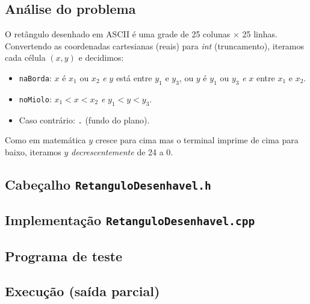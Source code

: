 \documentclass[11pt,a4paper]{article}
\begin{document}
\subsection*{An\'alise do problema}

O ret\^angulo desenhado em ASCII \'e uma grade de 25 colunas $\times$ 25 linhas. Convertendo as coordenadas cartesianas (reais) para \emph{int} (truncamento), iteramos cada c\'elula $(x, y)$ e decidimos:

\begin{itemize}[leftmargin=*,itemsep=0pt]
  \item \texttt{naBorda}: $x$ \'e $x_1$ ou $x_2$ \emph{e} $y$ est\'a entre $y_1$ e $y_3$, ou $y$ \'e $y_1$ ou $y_3$ \emph{e} $x$ entre $x_1$ e $x_2$.
  \item \texttt{noMiolo}: $x_1 < x < x_2$ \emph{e} $y_1 < y < y_3$.
  \item Caso contr\'ario: \texttt{.} (fundo do plano).
\end{itemize}

Como em matem\'atica $y$ cresce para cima mas o terminal imprime de cima para baixo, iteramos $y$ \emph{decrescentemente} de 24 a 0.

\subsection*{Cabe\c{c}alho \texttt{RetanguloDesenhavel.h}}



\subsection*{Implementa\c{c}\~ao \texttt{RetanguloDesenhavel.cpp}}



\subsection*{Programa de teste}



\subsection*{Execu\c{c}\~ao (sa\'ida parcial)}
\end{document}
